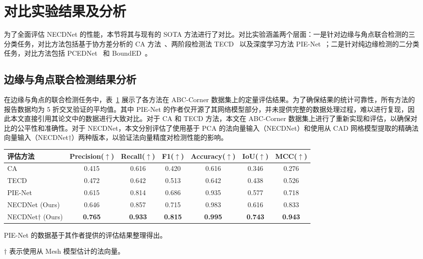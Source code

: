 \section{对比实验结果及分析}

为了全面评估 NECDNet 的性能，本节将其与现有的 SOTA 方法进行了对比。对比实验涵盖两个层面：一是针对边缘与角点联合检测的三分类任务，对比方法包括基于协方差分析的 CA 方法~\cite{bazazian_fast_2015}、两阶段检测法 TECD~\cite{ahmed_edge_2018} 以及深度学习方法 PIE-Net~\cite{wang_pienet_2020}；二是针对纯边缘检测的二分类任务，对比方法包括 PCEDNet~\cite{himeur_pcednet_2022} 和 BoundED~\cite{bode_bounded_2023}。

\subsection{边缘与角点联合检测结果分析}

在边缘与角点的联合检测任务中，表~\ref{tab:corner_result} 展示了各方法在 ABC-Corner 数据集上的定量评估结果。为了确保结果的统计可靠性，所有方法的报告数据均为 5 折交叉验证的平均值。其中 PIE-Net 的作者仅开源了其网络模型部分，并未提供完整的数据处理过程，难以进行复现，因此本文直接引用其论文中的数据进行大致对比。对于 CA 和 TECD 方法，本文在 ABC-Corner 数据集上进行了重新实现和评估，以确保对比的公平性和准确性。对于 NECDNet，本文分别评估了使用基于 PCA 的法向量输入（NECDNet）和使用从 CAD 网格模型提取的精确法向量输入（NECDNet$\dagger$）两种版本，以验证法向量精度对检测性能的影响。
\begin{table}[ht]
    \centering
    \small
    \setlength{\tabcolsep}{8pt}
    \begin{threeparttable}
    \label{tab:corner_result}
    \begin{tabular}{lcccccc}
        \toprule
        评估方法 & Precision($\uparrow$) & Recall($\uparrow$) & F1($\uparrow$) & Accuracy($\uparrow$) & IoU($\uparrow$) & MCC($\uparrow$) \\
        \midrule
        CA~\cite{bazazian_fast_2015} & 0.415 & 0.616 & 0.420 & 0.616 & 0.346 & 0.276 \\
        TECD~\cite{ahmed_edge_2018} & 0.472 & 0.642 & 0.513 & 0.642 & 0.438 & 0.526 \\
        PIE-Net~\cite{wang_pienet_2020} & 0.615 & 0.814 & 0.686 & 0.935 & 0.577 & 0.718 \\
        NECDNet (Ours)  & 0.646 & 0.857 & 0.715 & 0.983 & 0.616 & 0.833 \\
        NECDNet$\dagger$ (Ours)  & \textbf{0.765} & \textbf{0.933} & \textbf{0.815} & \textbf{0.995} & \textbf{0.743} & \textbf{0.943} \\
        \bottomrule
    \end{tabular}
    \begin{tablenotes}
        \footnotesize
        \item PIE-Net 的数据基于其作者提供的评估结果整理得出。
        \item $\dagger$ 表示使用从 Mesh 模型估计的法向量。 
     \end{tablenotes}
    \end{threeparttable}
\end{table}


